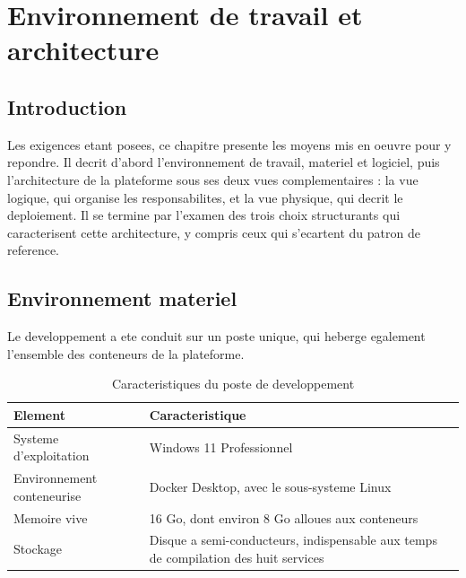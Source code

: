 \chapter{Environnement de travail et architecture}
\label{chap:architecture}

\section*{Introduction}

Les exigences etant posees, ce chapitre presente les moyens mis en oeuvre
pour y repondre. Il decrit d'abord l'environnement de travail, materiel
et logiciel, puis l'architecture de la plateforme sous ses deux vues
complementaires : la vue logique, qui organise les responsabilites, et la
vue physique, qui decrit le deploiement. Il se termine par l'examen des
trois choix structurants qui caracterisent cette architecture, y compris
ceux qui s'ecartent du patron de reference.

\section{Environnement materiel}

Le developpement a ete conduit sur un poste unique, qui heberge
egalement l'ensemble des conteneurs de la plateforme.

\begin{table}[H]
\centering
\caption{Caracteristiques du poste de developpement}
\label{tab:materiel}
\small
\begin{tabularx}{\textwidth}{@{}p{3.4cm}X@{}}
\toprule
\textbf{Element} & \textbf{Caracteristique} \\ \midrule
Systeme d'exploitation & Windows 11 Professionnel \\
Environnement conteneurise & Docker Desktop, avec le sous-systeme Linux \\
Memoire vive & 16 Go, dont environ 8 Go alloues aux conteneurs \\
Stockage & Disque a semi-conducteurs, indispensable aux temps de
  compilation des huit services \\
\bottomrule
\end{tabularx}
\end{table}

